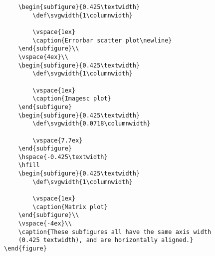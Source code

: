 \documentclass{article}
\begin{document}
\begin{verbatim}
    \begin{subfigure}{0.425\textwidth}
        \def\svgwidth{1\columnwidth}
        
        \vspace{1ex}
        \caption{Errorbar scatter plot\newline}
    \end{subfigure}\\
    \vspace{4ex}\\
    \begin{subfigure}{0.425\textwidth}
        \def\svgwidth{1\columnwidth}
        
        \vspace{1ex}
        \caption{Imagesc plot}
    \end{subfigure}
    \begin{subfigure}{0.425\textwidth}
        \def\svgwidth{0.0718\columnwidth}
        
        \vspace{7.7ex}
    \end{subfigure}
    \hspace{-0.425\textwidth}
    \hfill
    \begin{subfigure}{0.425\textwidth}
        \def\svgwidth{1\columnwidth}
        
        \vspace{1ex}
        \caption{Matrix plot}
    \end{subfigure}\\
    \vspace{-4ex}\\
    \caption{These subfigures all have the same axis width
    (0.425 textwidth), and are horizontally aligned.}
\end{figure}
\end{verbatim}
\end{document}
